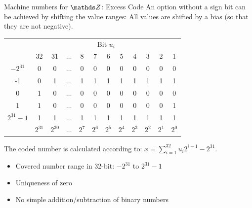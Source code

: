 \begin{vbframe}{Machine numbers for $\Z$: Excess Code}
An option without a sign bit can be achieved by shifting the value ranges: 
All values are shifted by a bias (so that they are not negative).
\begin{footnotesize}
\begin{center}
  \begin{tabular}{ c | ccccccccccc}
      & \multicolumn{11}{c}{Bit $u_i$} \\
      & 32 & 31  & $\hdots$ & 8 & 7 & 6 & 5 & 4 & 3 & 2 & 1 \\
    \hline
    $-2^{31}$    & 0 & 0 & $\hdots$ & 0 & 0 & 0 & 0 & 0 & 0 & 0 & 0 \\
    -1           & 0 & 1 & $\hdots$ & 1 & 1 & 1 & 1 & 1 & 1 & 1 & 1 \\
    0            & 1 & 0 & $\hdots$ & 0 & 0 & 0 & 0 & 0 & 0 & 0 & 0 \\
    1            & 1 & 0 & $\hdots$ & 0 & 0 & 0 & 0 & 0 & 0 & 0 & 1 \\
    $2^{31}-1$   & 1 & 1 & $\hdots$ & 1 & 1 & 1 & 1 & 1 & 1 & 1 & 1 \\
    \hline
      & $2^{31}$ & $2^{30}$ & $\hdots$ & $2^7$ & $2^6$ & $2^5$ & $2^4$ & $2^3$ & $2^2$ & $2^1$ & $2^0$
  \end{tabular}
\end{center}
\end{footnotesize}

The coded number is calculated according to: $x = \sum_{i=1}^{32} u_i 2^{i-1} - 2^{31}$.

\begin{itemize}
  \item Covered number range in 32-bit: $-2^{31}$ to $2^{31} - 1$
  \item Uniqueness of zero
  \item No simple addition/subtraction of binary numbers
\end{itemize}

\end{vbframe}


